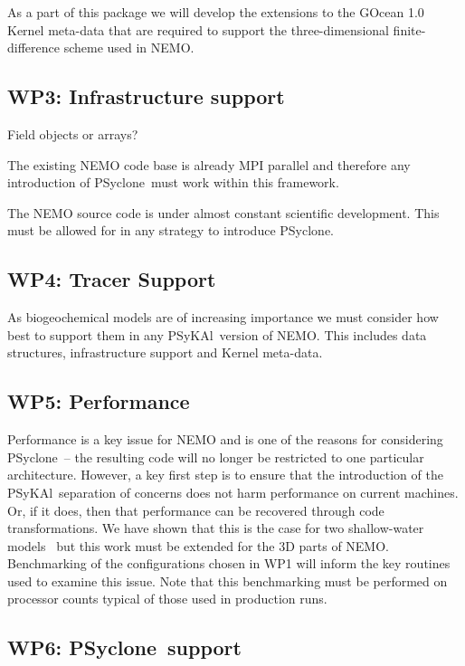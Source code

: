 \documentclass{article}
\newcommand{\psykal}{{PS}y{KA}l}
\newcommand{\psyclone}{{PS}yclone}
\begin{document}
As a part of this package we will develop the extensions to the GOcean
1.0 Kernel meta-data that are required to support the
three-dimensional finite-difference scheme used in NEMO.

\subsection{WP3: Infrastructure support}
\label{wp3_infrastructure}

Field objects or arrays?

The existing NEMO code base is already MPI parallel and therefore any
introduction of \psyclone\ must work within this framework.

The NEMO source code is under almost constant scientific
development. This must be allowed for in any strategy to introduce
\psyclone.

\subsection{WP4: Tracer Support}
\label{wp4_tracers}

As biogeochemical models are of increasing importance we must consider
how best to support them in any \psykal\ version of NEMO. This
includes data structures, infrastructure support and Kernel meta-data.

\subsection{WP5: Performance}
\label{wp5_perf}

Performance is a key issue for NEMO and is one of the reasons for
considering \psyclone\ -- the resulting code will no longer be
restricted to one particular architecture. However, a key first step
is to ensure that the introduction of the \psykal\ separation of
concerns does not harm performance on current machines. Or, if it
does, then that performance can be recovered through code
transformations. We have shown that this is the case for two
shallow-water models~\cite{XXX} but this work must be extended for the
3D parts of NEMO. Benchmarking of the configurations chosen in WP1
will inform the key routines used to examine this issue. Note that
this benchmarking must be performed on processor counts typical of
those used in production runs.

\subsection{WP6: \psyclone\ support}
\label{wp6_autogen}
\end{document}
